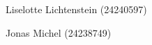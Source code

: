 \begin{titlepage}
    \centering
    \vspace*{0.2cm}
    
    {\Huge \mytitle \par}
    \vspace{1.4cm}
    
    {\Large \myassignment \par}    
    {\Large \mycourse \par}
    
    \vspace{1.4cm}
    
    {\large Liselotte Lichtenstein (24240597) \par}
    {\large Jonas Michel (24238749) \par}



    \vspace{0.9cm}



    \vfill
    
    {\Large \mydate \par}
\end{titlepage}